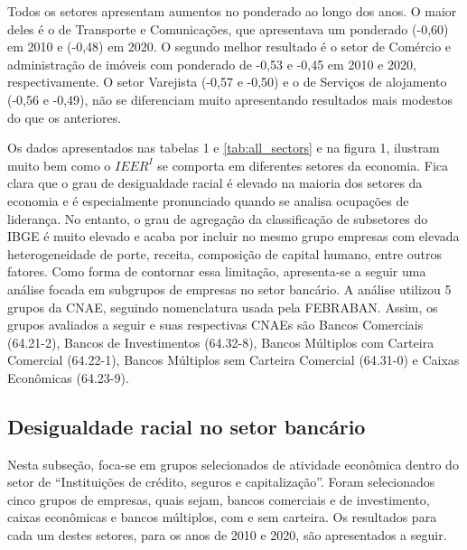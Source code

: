 \documentclass[12pt]{article}
\begin{document}
 \label{setor_ts}

\par Todos os setores apresentam aumentos no ponderado ao longo dos anos. O maior deles é o de Transporte e Comunicações, que apresentava um ponderado (-0,60) em 2010 e (-0,48) em 2020. O segundo melhor resultado é o setor de Comércio e administração de imóveis com ponderado de -0,53 e -0,45 em 2010 e 2020, respectivamente. O setor Varejista (-0,57 e -0,50) e o de Serviços de alojamento (-0,56 e -0,49), não se diferenciam muito apresentando resultados mais modestos do que os anteriores. 

\par Os dados apresentados nas tabelas 1 e \ref{tab:all_sectors} e na figura 1, ilustram muito bem como o $IEER^{I}$ se comporta em diferentes setores da economia. Fica clara que o grau de desigualdade racial é elevado na maioria dos setores da economia e é especialmente pronunciado quando se analisa ocupações de liderança. No entanto, o grau de agregação da classificação de subsetores do IBGE é muito elevado e acaba por incluir no mesmo grupo empresas com elevada heterogeneidade de porte, receita, composição de capital humano, entre outros fatores. Como forma de contornar essa limitação, apresenta-se a seguir uma análise focada em subgrupos de empresas no setor bancário. A análise utilizou 5 grupos da CNAE, seguindo nomenclatura usada pela FEBRABAN. Assim, os grupos avaliados a seguir e suas respectivas CNAEs são Bancos Comerciais (64.21-2), Bancos de Investimentos (64.32-8), Bancos Múltiplos com Carteira Comercial (64.22-1), Bancos Múltiplos sem Carteira Comercial (64.31-0) e Caixas Econômicas (64.23-9).

\subsection{Desigualdade racial no setor bancário}

\par Nesta subseção, foca-se em grupos selecionados de atividade econômica dentro do setor de \enquote{Instituições de crédito, seguros e capitalização}. Foram selecionados cinco grupos de empresas, quais sejam, bancos comerciais e de investimento, caixas econômicas e bancos múltiplos, com e sem carteira. Os resultados para cada um destes setores, para os anos de 2010 e 2020, são apresentados a seguir.




\end{document}
